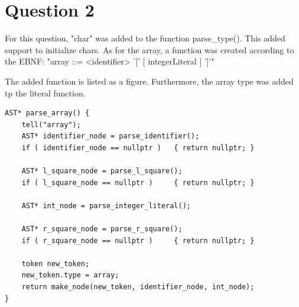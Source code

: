 \documentclass[a4paper, 12pt]{article}
\begin{document}
\section{Question 2}
For this question, "char" was added to the function parse\_type(). This added support to initialize chars.
As for the array, a function was created according to the EBNF: "array ::= <identifier> '[' [ integerLiteral ] ']'"

The added function is listed as a figure. Furthermore, the array type was added tp the literal function.

\begin{lstlisting}[caption="Parsing arrays"]
AST* parse_array() {
    tell("array");
    AST* identifier_node = parse_identifier();
    if ( identifier_node == nullptr )   { return nullptr; }

    AST* l_square_node = parse_l_square();
    if ( l_square_node == nullptr )     { return nullptr; }

    AST* int_node = parse_integer_literal();

    AST* r_square_node = parse_r_square();
    if ( r_square_node == nullptr )     { return nullptr; }

    token new_token;
    new_token.type = array;
    return make_node(new_token, identifier_node, int_node);
}
\end{lstlisting}
\end{document}
